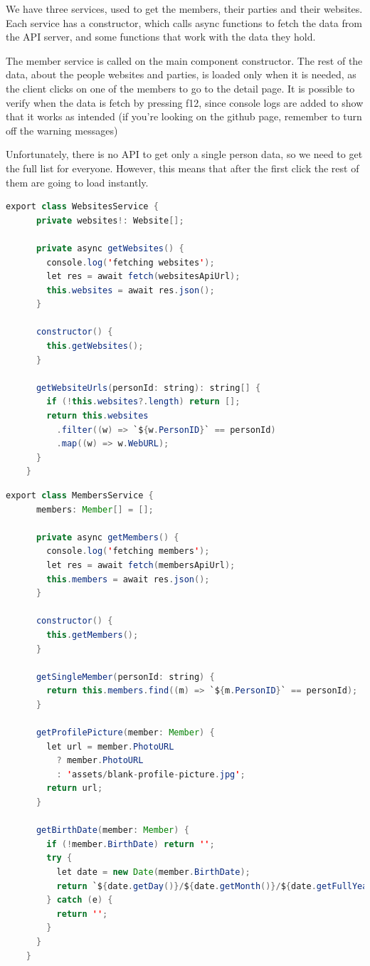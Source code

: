 \documentclass[12pt, a4paper]{article}
\begin{document}
  We have three services, used to get the members, their parties and their websites. Each service has a constructor, which calls async functions to fetch the data from the API server, and some functions that work with the data they hold.

  The member service is called on the main component constructor. The rest of the data, about the people websites and parties, is loaded only when it is needed, as the client clicks on one of the members to go to the detail page. It is possible to verify when the data is fetch by pressing f12, since console logs are added to show that it works as intended (if you're looking on the github page, remember to turn off the warning messages)
  
  Unfortunately, there is no API to get only a single person data, so we need to get the full list for everyone. However, this means that after the first click the rest of them are going to load instantly.

  \begin{lstlisting}[language=java, caption={Websites API Service}]
    export class WebsitesService {
      private websites!: Website[];

      private async getWebsites() {
        console.log('fetching websites');
        let res = await fetch(websitesApiUrl);
        this.websites = await res.json();
      }

      constructor() {
        this.getWebsites();
      }

      getWebsiteUrls(personId: string): string[] {
        if (!this.websites?.length) return [];
        return this.websites
          .filter((w) => `${w.PersonID}` == personId)
          .map((w) => w.WebURL);
      }
    }\end{lstlisting}

  \pagebreak
  \begin{lstlisting}[language=java, caption={Members API Service}]
    export class MembersService {
      members: Member[] = [];

      private async getMembers() {
        console.log('fetching members');
        let res = await fetch(membersApiUrl);
        this.members = await res.json();
      }

      constructor() {
        this.getMembers();
      }

      getSingleMember(personId: string) {
        return this.members.find((m) => `${m.PersonID}` == personId);
      }

      getProfilePicture(member: Member) {
        let url = member.PhotoURL
          ? member.PhotoURL
          : 'assets/blank-profile-picture.jpg';
        return url;
      }

      getBirthDate(member: Member) {
        if (!member.BirthDate) return '';
        try {
          let date = new Date(member.BirthDate);
          return `${date.getDay()}/${date.getMonth()}/${date.getFullYear()}`;
        } catch (e) {
          return '';
        }
      }
    }\end{lstlisting}
  
\end{document}
